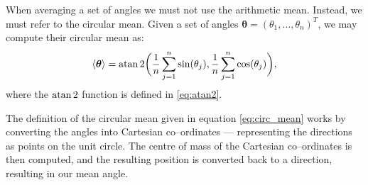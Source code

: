 When averaging a set of angles we must not use the arithmetic mean. Instead, we must refer to the circular mean. Given a set of angles $\bm{\theta} = (\theta_1, \ldots, \theta_n)^T$, we may compute their circular mean as:
\begin{equation}
	\label{eq:circ_mean}
	\langle \bm{\theta} \rangle = \atan2\bigg(\frac{1}{n} \sum_{j=1}^n \sin(\theta_j), \frac{1}{n} \sum_{j=1}^n \cos(\theta_j)\bigg),
\end{equation}
where the $\atan2$ function is defined in \cref{eq:atan2}.

The definition of the circular mean given in equation \cref{eq:circ_mean} works by converting the angles into Cartesian co--ordinates --- representing the directions as points on the unit circle. The centre of mass of the Cartesian co--ordinates is then computed, and the resulting position is converted back to a direction, resulting in our mean angle.
